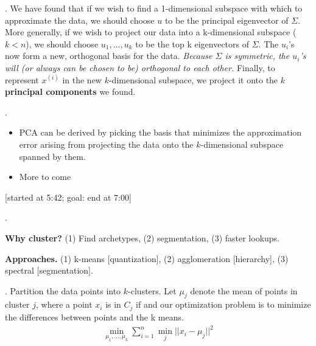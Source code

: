 \documentclass[12pt]{article}
\newcommand{\myspace}{\vspace{2\bigskipamount}}
\newcommand\p{\Needspace{10\baselineskip} \noindent}
\begin{document}
\myspace 
\p {}. We have found that if we wish to find a 1-dimensional subspace with which to approximate the data, we should choose $u$ to be the principal eigenvector of $\Sigma$. More generally, if we wish to project our data into a k-dimensional subspace ($k < n$), we should choose $u_1,\ldots , u_k$ to be the top k eigenvectors of $\Sigma$. The $u_i$'s now form a new, orthogonal basis for the data. \emph{Because $\Sigma$ is symmetric, the $u_i$'s will (or always can be chosen to be) orthogonal to each other.} Finally, to represent $x^{(i)}$ in the new $k$-dimensional subspace, we project it onto the $k$ \textbf{principal components} we found.

\myspace
\p {}. 
\begin{itemize}
	\item PCA can be derived by picking the basis that minimizes the approximation error arising from projecting the data onto the $k$-dimensional subspace spanned by them.
	
	\item More to come \textellipsis
\end{itemize}


[started at 5:42; goal: end at 7:00]

\p {}. 
\begin{compactitem}
	\item \textbf{Why cluster?} (1) Find archetypes, (2) segmentation, (3) faster lookups. 
	\item \textbf{Approaches.} (1) k-means [quantization], (2) agglomeration [hierarchy], (3) spectral [segmentation]. 
\end{compactitem}
	
\myspace
\p {}. Partition the data points into $k$-clusters. Let $\mu_j$ denote the mean of points in cluster $j$, where a point $x_i$ is in $C_j$ if 
and our optimization problem is to minimize the differences between points and the k means.
\begin{align}
\min_{\mu_1, \ldots, \mu_k} \sum_{i = 1}^n \min_j || x_i - \mu_j ||^2
\end{align}\\
\end{document}
